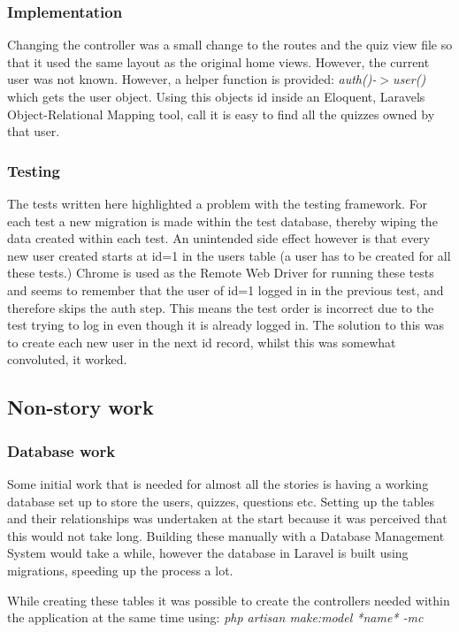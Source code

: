 \subsubsection{Implementation}
Changing the controller was a small change to the routes and the quiz view file so that it used the same layout as the original home views. However, the current user was not known. However, a helper function is provided: \textit{auth()-$>$user()} which gets the user object. Using this objects id inside an Eloquent, Laravels Object-Relational Mapping tool, call it is easy to find all the quizzes owned by that user.
\subsubsection{Testing}
The tests written here highlighted a problem with the testing framework. For each test a new migration is made within the test database, thereby wiping the data created within each test. An unintended side effect however is that every new user created starts at id=1 in the users table (a user has to be created for all these tests.) Chrome is used as the Remote Web Driver for running these tests and seems to remember that the user of id=1 logged in in the previous test, and therefore skips the auth step. This means the test order is incorrect due to the test trying to log in even though it is already logged in. The solution to this was to create each new user in the next id record, whilst this was somewhat convoluted, it worked.
\newpage

\subsection{Non-story work}
\subsubsection{Database work}
Some initial work that is needed for almost all the stories is having a working database set up to store the users, quizzes, questions etc. Setting up the tables and their relationships was undertaken at the start because it was perceived that this would not take long. Building these manually with a Database Management System would take a while, however the database in Laravel is built using migrations, speeding up the process a lot.

While creating these tables it was possible to create the controllers needed within the application at the same time using: \textit{php artisan make:model *name* -mc } 
